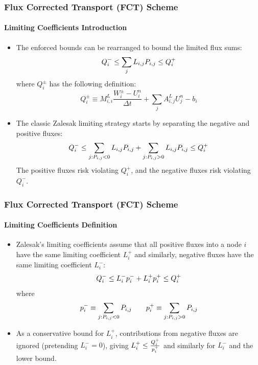 \documentclass{beamer}
\begin{document}
\begin{frame}
\frametitle{Flux Corrected Transport (FCT) Scheme}
\framesubtitle{Limiting Coefficients Introduction}

\begin{itemize}
   \item The enforced bounds can be rearranged to bound the limited flux sums:
      \begin{equation}
         Q^-_i \leq \sum\limits_j L\ij \correctionfluxij \leq Q^+_i
      \end{equation}
      where $Q_i^\pm$ has the following definition:
      \begin{equation}
         Q_i^\pm \equiv M_{i,i}^L\frac{W_i^\pm-U_i^n}{\Delta t}
         + \sum\limits_j A_{i,j}^L U_j^n - b_i
      \end{equation}
   \item The classic Zalesak limiting strategy starts by separating the
      negative and positive fluxes:
      \begin{equation}
         Q^-_i \leq \sum\limits_{j:\correctionfluxij<0} L\ij \correctionfluxij +
            \sum\limits_{j:\correctionfluxij>0} L\ij \correctionfluxij\leq Q^+_i
      \end{equation}
      The positive fluxes risk violating $Q_i^+$, and the negative fluxes risk
      violating $Q_i^-$.
\end{itemize}

\end{frame}
\begin{frame}
\frametitle{Flux Corrected Transport (FCT) Scheme}
\framesubtitle{Limiting Coefficients Definition}

\begin{itemize}
   \item Zalesak's limiting coefficients assume that
      all positive fluxes into a node $i$ have the same limiting coefficient
      $L^+_i$ and similarly, negative fluxes have the same limiting coefficient
      $L^-_i$:
      \begin{equation}
         Q^-_i \leq L^-_i p^-_i + L^+_i p^+_i \leq Q^+_i
      \end{equation}
      where
      \begin{equation}
         \correctionfluxletter_i^- \equiv \sum\limits_{j:\correctionfluxij<0} \correctionfluxij \qquad
         \correctionfluxletter_i^+ \equiv \sum\limits_{j:\correctionfluxij>0} \correctionfluxij
      \end{equation}
   \item As a conservative bound for $L^+_i$, contributions from negative fluxes
      are ignored (pretending $L_i^-=0$), giving $L^+_i \leq \frac{Q_i^+}{p_i^+}$
      and similarly for $L^-_i$ and the lower bound.
\end{itemize}

\end{frame}
\end{document}
